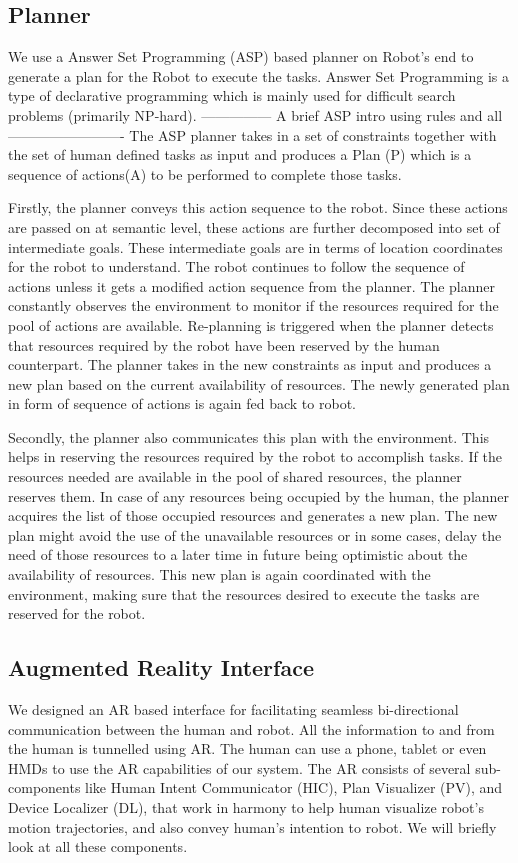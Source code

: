 \documentclass{article}
\begin{document}
\subsection{Planner}
We use a Answer Set Programming (ASP) based planner on Robot's end to generate a plan for the Robot to execute the tasks. Answer Set Programming is a type of declarative programming which is mainly used for difficult search problems (primarily NP-hard). --------------- A brief ASP intro using rules and all -------------------------
The ASP planner takes in a set of constraints together with the set of human defined tasks as input and produces a Plan (P) which is a sequence of actions(A) to be performed to complete those tasks.

Firstly, the planner conveys this action sequence to the robot. Since these actions are passed on at semantic level, these actions are further decomposed into set of intermediate goals. These intermediate goals are in terms of location coordinates for the robot to understand. The robot continues to follow the sequence of actions unless it gets a modified action sequence from the planner. The planner constantly observes the environment to monitor if the resources required for the pool of actions are available. Re-planning is triggered when the planner detects that resources required by the robot have been reserved by the human counterpart. The planner takes in the new constraints as input and produces a new plan based on the current availability of resources. The newly generated plan in form of sequence of actions is again fed back to robot.

Secondly, the planner also communicates this plan with the environment. This helps in reserving the resources required by the robot to accomplish tasks. If the resources needed are available in the pool of shared resources, the planner reserves them. In case of any resources being occupied by the human, the planner acquires the list of those occupied resources and generates a new plan. The new plan might avoid the use of the unavailable resources or in some cases, delay the need of those resources to a later time in future being optimistic about the  availability of resources. This new plan is again coordinated with the environment, making sure that the resources desired to execute the tasks are reserved for the robot.

\subsection{Augmented Reality Interface}
We designed an AR based interface for facilitating seamless bi-directional communication between the human and robot. All the information to and from the human is tunnelled using AR. The human can use a phone, tablet or even HMDs to use the AR capabilities of our system. The AR consists of several sub-components like Human Intent Communicator (HIC), Plan Visualizer (PV), and Device Localizer (DL), that work in harmony to help human visualize robot's motion trajectories, and also convey human's intention to robot. We will briefly look at all these components.
\end{document}
